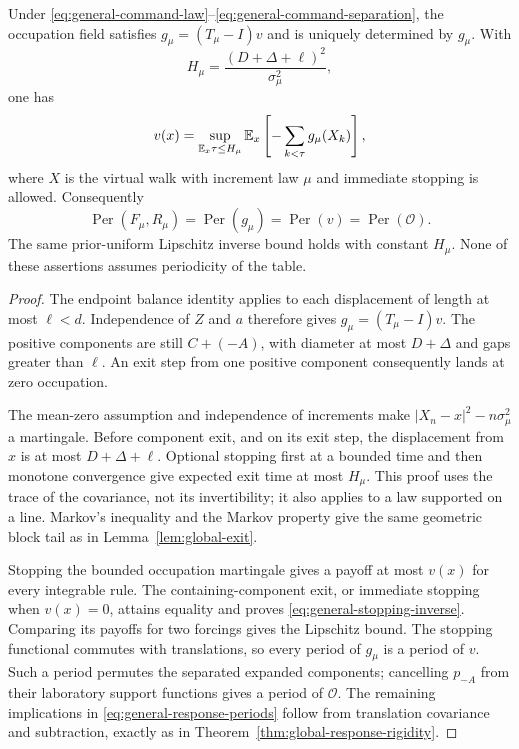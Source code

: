 \begin{theorem}
\label{thm:general-command-rigidity}
Under \eqref{eq:general-command-law}--\eqref{eq:general-command-separation},
the occupation field satisfies $g_\mu=(T_\mu-I)v$ and is uniquely
determined by $g_\mu$. With
\begin{equation}\label{eq:general-exit-budget}
                     H_\mu=\frac{(D+\Delta+\ell)^2}{\sigma_\mu^2},
\end{equation}
one has
\begin{equation}\label{eq:general-stopping-inverse}
 v(x)=\sup_{\mathbb E_x\tau\le H_\mu}
           \mathbb E_x\left[-\sum_{k<\tau}g_\mu(X_k)\right],
\end{equation}
where $X$ is the virtual walk with increment law $\mu$ and immediate
stopping is allowed. Consequently
\begin{equation}\label{eq:general-response-periods}
 \operatorname{Per}(F_\mu,R_\mu)
 =\operatorname{Per}(g_\mu)
 =\operatorname{Per}(v)
 =\operatorname{Per}(\mathcal O).
\end{equation}
The same prior-uniform Lipschitz inverse bound holds with constant
$H_\mu$. None of these assertions assumes periodicity of the table.
\end{theorem}
\begin{proof}
The endpoint balance identity applies to each displacement of length
at most $\ell<d$. Independence of $Z$ and $a$ therefore gives
$g_\mu=(T_\mu-I)v$. The positive components are still $C+(-A)$,
with diameter at most $D+\Delta$ and gaps greater than $\ell$.
An exit step from one positive component consequently lands at zero
occupation.

The mean-zero assumption and independence of increments make
$|X_n-x|^2-n\sigma_\mu^2$ a martingale. Before component exit,
and on its exit step, the displacement from $x$ is at most
$D+\Delta+\ell$. Optional stopping first at a bounded time and
then monotone convergence give expected exit time at most $H_\mu$.
This proof uses the trace of the covariance, not its invertibility;
it also applies to a law supported on a line. Markov's inequality and
the Markov property give the same geometric block tail as in
Lemma~\ref{lem:global-exit}.

Stopping the bounded occupation martingale gives a payoff at most
$v(x)$ for every integrable rule. The containing-component exit,
or immediate stopping when $v(x)=0$, attains equality and proves
\eqref{eq:general-stopping-inverse}. Comparing its payoffs for two
forcings gives the Lipschitz bound. The stopping functional commutes
with translations, so every period of $g_\mu$ is a period of $v$.
Such a period permutes the separated expanded components; cancelling
$p_{-A}$ from their laboratory support functions gives a period of
$\mathcal O$. The remaining implications in
\eqref{eq:general-response-periods} follow from translation covariance
and subtraction, exactly as in
Theorem~\ref{thm:global-response-rigidity}.
\end{proof}

